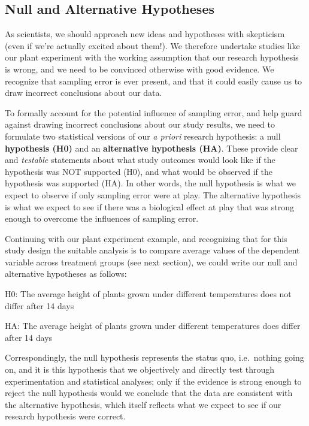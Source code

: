\documentclass[
]{book}
\begin{document}
\hypertarget{null-and-alternative-hypotheses}{%
\subsection*{Null and Alternative Hypotheses}\label{null-and-alternative-hypotheses}}

As scientists, we should approach new ideas and hypotheses with skepticism (even if we're actually excited about them!). We therefore undertake studies like our plant experiment with the working assumption that our research hypothesis is wrong, and we need to be convinced otherwise with good evidence. We recognize that sampling error is ever present, and that it could easily cause us to draw incorrect conclusions about our data.

To formally account for the potential influence of sampling error, and help guard against drawing incorrect conclusions about our study results, we need to formulate two statistical versions of our \emph{a priori} research hypothesis: a null \textbf{hypothesis (H0)} and an \textbf{alternative hypothesis (HA)}. These provide clear and \emph{testable} statements about what study outcomes would look like if the hypothesis was NOT supported (H0), and what would be observed if the hypothesis was supported (HA). In other words, the null hypothesis is what we expect to observe if only sampling error were at play. The alternative hypothesis is what we expect to see if there was a biological effect at play that was strong enough to overcome the influences of sampling error.

Continuing with our plant experiment example, and recognizing that for this study design the suitable analysis is to compare average values of the dependent variable across treatment groups (see next section), we could write our null and alternative hypotheses as follows:

H0: The average height of plants grown under different temperatures does not differ after 14 days

HA: The average height of plants grown under different temperatures does differ after 14 days

Correspondingly, the null hypothesis represents the status quo, i.e.~nothing going on, and it is this hypothesis that we objectively and directly test through experimentation and statistical analyses; only if the evidence is strong enough to reject the null hypothesis would we conclude that the data are consistent with the alternative hypothesis, which itself reflects what we expect to see if our research hypothesis were correct.
\end{document}
